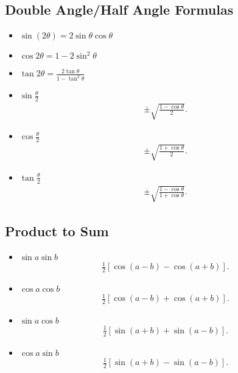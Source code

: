 \documentclass{report}
\begin{document}
      \bigbreak \noindent \bigbreak \noindent 
      \subsection{Double Angle/Half Angle Formulas}
      \begin{itemize}
        \item $\sin{(2\theta )} = 2\sin{\theta }\cos{\theta } $
        \item $\cos{2\theta } = 1- 2\sin^{2}{\theta } $
        \item $\tan{2\theta} = \frac{2\tan{\theta }}{1-\tan^{2}{\theta }}$
        \item $\sin{\frac{\theta}{2}} $
          \begin{align*}
            \pm \sqrt{\frac{1-\cos{\theta }}{2}}
          .\end{align*}
        \item $\cos{\frac{\theta}{2}}$
          \begin{align*}
            \pm \sqrt{\frac{1+\cos{\theta }}{2}}
          .\end{align*}
        \item $\tan{\frac{\theta }{2}} $
          \begin{align*}
            \pm \sqrt{\frac{1-\cos{\theta }}{1+\cos{\theta }}}
          .\end{align*}
      \end{itemize}

      \bigbreak \noindent \bigbreak \noindent 
      \subsection{Product to Sum}
      \begin{itemize}
        \item $\sin{a}\sin{b} $
          \begin{align*}
            \frac{1}{2}[\cos{(a-b)-\cos{(a+b)}}]
          .\end{align*}
        \item $\cos{a}\cos{b}$
          \begin{align*}
            \frac{1}{2}[\cos{(a-b)} + \cos{(a+b)}]
          .\end{align*}
        \item $\sin{a}\cos{b}$
          \begin{align*}
            \frac{1}{2}[\sin{(a+b)}+\sin{(a-b)}]
          .\end{align*}
        \item $\cos{a}\sin{b}$
          \begin{align*}
            \frac{1}{2}[\sin{(a+b)} - \sin{(a-b)}]
          .\end{align*}
      \end{itemize}
\end{document}
